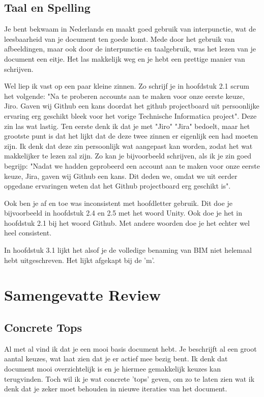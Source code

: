 \documentclass[a4paper]{report}
\begin{document}
\section{Taal en Spelling}
Je bent bekwaam in Nederlands en maakt goed gebruik van interpunctie, wat de leesbaarheid van je document ten goede komt. 
Mede door het gebruik van afbeeldingen, maar ook door de interpunctie en taalgebruik, was het lezen van je document een eitje. 
Het las makkelijk weg en je hebt een prettige manier van schrijven.
\par\smallskip 
Wel liep ik vast op een paar kleine zinnen. 
Zo schrijf je in hoofdstuk 2.1 scrum het volgende: "Na te proberen accounts aan te maken voor onze eerste keuze, Jiro. Gaven wij Github een kans doordat het github projectboard uit persoonlijke ervaring erg geschikt bleek voor het vorige Technische Informatica project".
Deze zin las wat lastig. Ten eerste denk ik dat je met "Jiro" "Jira" bedoelt, maar het grootste punt is dat het lijkt dat de deze twee zinnen er eigenlijk een had moeten zijn. Ik denk dat deze zin persoonlijk wat aangepast kan worden, zodat het wat makkelijker te lezen zal zijn. 
Zo kan je bijvoorbeeld schrijven, als ik je zin goed begrijp: "Nadat we hadden geprobeerd een account aan te maken voor onze eerste keuze, Jira, gaven wij Github een kans. Dit deden we, omdat we uit eerder opgedane ervaringen weten dat het Github projectboard erg geschikt is".
\par\smallskip
Ook ben je af en toe was inconsistent met hoofdletter gebruik. Dit doe je bijvoorbeeld in hoofdstuk 2.4 en 2.5 met het woord Unity. Ook doe je het in hoofdstuk 2.1 bij het woord Github. 
Met andere woorden doe je het echter wel heel consistent.
\par \smallskip 
In hoofdstuk 3.1 lijkt het alsof je de volledige benaming van BIM niet helemaal hebt uitgeschreven. Het lijkt afgekapt bij de 'm'. 

\chapter{Samengevatte Review}
\section{Concrete Tops}
Al met al vind ik dat je een mooi basis document hebt. Je beschrijft al een groot aantal keuzes, wat laat zien dat je er actief mee bezig bent.
Ik denk dat document mooi overzichtelijk is en je hiermee gemakkelijk keuzes kan terugvinden.
Toch wil ik je wat concrete 'tops' geven, om zo te laten zien wat ik denk dat je zeker moet behouden in nieuwe iteraties van het document. 
\end{document}
